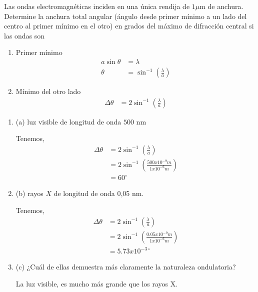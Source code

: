     
    \begin{problema}
        Las ondas electromagnéticas inciden en una única rendija de $1 \mu \mathrm{m}$ de anchura. Determine la anchura total angular (ángulo desde primer mínimo a un lado del centro al primer mínimo en el otro) en grados del máximo de difracción central si las ondas son 
        \begin{cajita}
            \begin{enumerate}
                \item Primer mínimo 
                \begin{align*}
                    a\sin\theta &= \lambda\\
                    \theta &= \sin^{-1}\left(\frac{\lambda}{a}\right)
                \end{align*}
                \item Mínimo del otro lado 
                \begin{align*}
                    \Delta\theta &= 2\sin^{-1}\left(\frac{\lambda}{a}\right)
                \end{align*}
            \end{enumerate}
            
        \end{cajita}
        \begin{enumerate}
            \item (a) luz visible de longitud de onda $500$ nm 
            \begin{sol}
                Tenemos, 
                \begin{align*}
                    \Delta\theta &= 2\sin^{-1}\left(\frac{\lambda}{a}\right)\\
                    &= 2\sin^{-1}\left(\frac{500x10^{-9}m}{1x10^{-6}m}\right)\\
                    &= 60^{\circ}
                \end{align*}
            \end{sol}
            \item (b) rayos $X$ de longitud de onda 0,05 $\mathrm{nm}$.
            \begin{sol}
                Tenemos, 
                \begin{align*}
                    \Delta\theta &= 2\sin^{-1}\left(\frac{\lambda}{a}\right)\\
                    &= 2\sin^{-1}\left(\frac{0.05x10^{-9}m}{1x10^{-6}m}\right)\\
                    &= 5.73x10^{-3\circ}
                \end{align*}
            \end{sol}
            \item (c) ¿Cuál de ellas demuestra más claramente la naturaleza ondulatoria?
            \begin{sol}
                La luz visible, es mucho más grande que los rayos X. 
            \end{sol}
        \end{enumerate}
        
        
    \end{problema}
    
